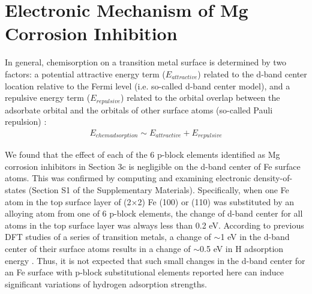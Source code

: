 \section{Electronic Mechanism of Mg Corrosion Inhibition}

In general, chemisorption on a transition metal surface is determined by two factors: a potential attractive energy term ($E_{attractive}$) related to the d-band center location relative to the Fermi level (i.e. so-called d-band center model), and a repulsive energy term ($E_{repulsive}$) related to the orbital overlap between the adsorbate orbital and the orbitals of other surface atoms (so-called Pauli repulsion) \cite{hammer1995electronic,hammer1995gold}:
\begin{align}
E_{chem adsorption} \sim E_{attractive} + E_{repulsive}
\label{Chap:Mg_H:eq:electronic}
\end{align}

We found that the effect of each of the 6 p-block elements identified as Mg corrosion inhibitors in Section 3c is negligible on the d-band center of Fe surface atoms. This was confirmed by computing and examining electronic density-of-states (Section S1 of the Supplementary Materials). Specifically, when one Fe atom in the top surface layer of (2$\times$2) Fe (100) or (110) was substituted by an alloying atom from one of 6 p-block elements, the change of d-band center for all atoms in the top surface layer was always less than 0.2 eV. According to previous DFT studies of a series of transition metals, a change of $\sim$1 eV in the d-band center of their surface atoms results in a change of $\sim$0.5 eV in H adsorption energy \cite{greeley2006computational}. Thus, it is not expected that such small changes in the d-band center for an Fe surface with p-block substitutional elements reported here can induce significant variations of hydrogen adsorption strengths.


